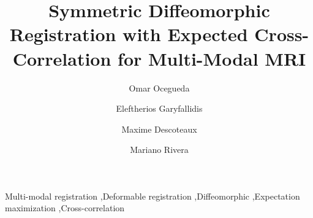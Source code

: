 \documentclass[authoryear,preprint,review,12pt]{elsarticle}
\begin{document}
\begin{frontmatter}

\title{\textbf{Symmetric Diffeomorphic Registration with Expected Cross-Correlation for Multi-Modal MRI}}
\author[cimat]{Omar Ocegueda}
\author[scil]{Eleftherios Garyfallidis}
\author[scil]{Maxime Descoteaux}
\author[cimat]{Mariano Rivera}
\address[cimat]{Centro de Investigaci\'{o}n en Matem\'{a}ticas, Guanajuato, Gto, M\'{e}xico}
\address[scil]{Computer Science Department, Universit\'{e} de Sherbrooke, Sherbrooke, Qu\'{e}bec, Canada}



\begin{keyword}
Multi-modal registration \sep Deformable registration \sep Diffeomorphic \sep Expectation maximization \sep Cross-correlation
\end{keyword}

\end{frontmatter}










\end{document}
